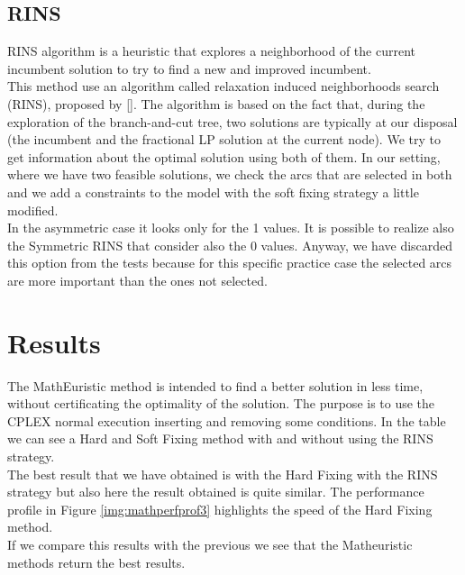 \subsection{RINS}
RINS algorithm is a heuristic that explores a neighborhood of the current incumbent solution to try to find a new and improved incumbent.\\
This method use an algorithm called relaxation induced neighborhoods search (RINS), proposed by [\cite{danna2005exploring}]. The algorithm is based on the fact that, during the exploration of the branch-and-cut tree, two solutions are typically at our disposal (the incumbent and the fractional LP solution at the current node). We try to get information about the optimal solution using both of them. In our setting, where we have two feasible solutions, we check the arcs that are selected in both and we add a constraints to the model with the soft fixing strategy a little modified.\\
In the asymmetric case it looks only for the 1 values.
It is possible to realize also the Symmetric RINS that consider also the $0$ values. Anyway, we have discarded this option from the tests because for this specific practice case the selected arcs are more important than the ones not selected.
\section{Results}
The MathEuristic method is intended to find a better solution in less time, without certificating the optimality of the solution. The purpose is to use the \textsc{CPLEX} normal execution inserting and removing some conditions. In the table we can see a Hard and Soft Fixing method with and without using the RINS strategy.\\
The best result that we have obtained is with the Hard Fixing with the RINS strategy but also here the result obtained is quite similar. The performance profile in Figure \ref{img:mathperfprof3} highlights the speed of the Hard Fixing method. \\
If we compare this results with the previous we see that the Matheuristic methods return the best results.

